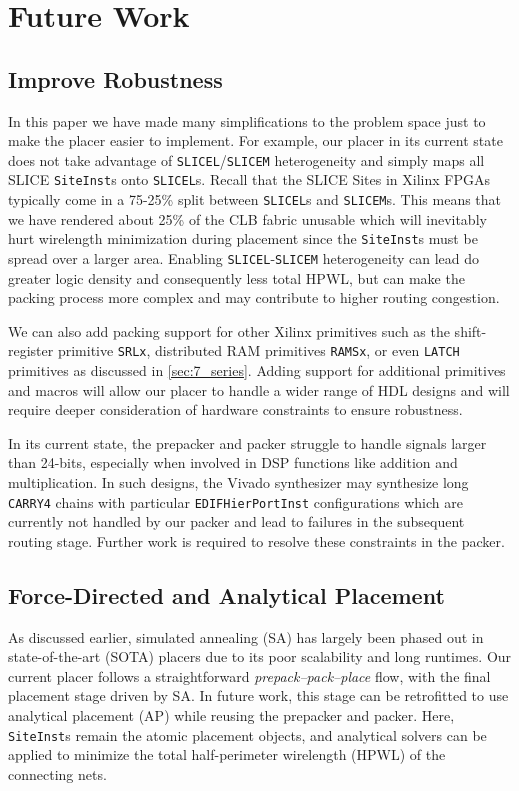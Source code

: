 \section{Future Work}


\subsection{Improve Robustness}
In this paper we have made many simplifications to the problem space just to make the placer easier to implement.
For example, our placer in its current state does not take advantage of \texttt{SLICEL}/\texttt{SLICEM} heterogeneity and simply maps all SLICE \texttt{SiteInst}s onto \texttt{SLICEL}s. 
Recall that the SLICE Sites in Xilinx FPGAs typically come in a 75-25\% split between \texttt{SLICEL}s and \texttt{SLICEM}s. 
This means that we have rendered about 25\% of the CLB fabric unusable which will inevitably hurt wirelength minimization during placement since the \texttt{SiteInst}s must be spread over a larger area. 
Enabling \texttt{SLICEL}-\texttt{SLICEM} heterogeneity can lead do greater logic density and consequently less total HPWL, but can make the packing process more complex and may contribute to higher routing congestion.

We can also add packing support for other Xilinx primitives such as the shift-register primitive \texttt{SRLx}, distributed RAM primitives \texttt{RAMSx}, or even \texttt{LATCH} primitives as discussed in \ref{sec:7_series}.
Adding support for additional primitives and macros will allow our placer to handle a wider range of HDL designs and will require deeper consideration of hardware constraints to ensure robustness.

In its current state, the prepacker and packer struggle to handle signals larger than 24-bits, especially when involved in DSP functions like addition and multiplication. 
In such designs, the Vivado synthesizer may synthesize long \texttt{CARRY4} chains with particular \texttt{EDIFHierPortInst} configurations which are currently not handled by our packer and lead to failures in the subsequent routing stage.
Further work is required to resolve these constraints in the packer.

\subsection{Force-Directed and Analytical Placement}
As discussed earlier, simulated annealing (SA) has largely been phased out in state-of-the-art (SOTA) placers due to its poor scalability and long runtimes. 
Our current placer follows a straightforward \emph{prepack–pack–place} flow, with the final placement stage driven by SA. 
In future work, this stage can be retrofitted to use analytical placement (AP) while reusing the prepacker and packer. 
Here, \texttt{SiteInst}s remain the atomic placement objects, and analytical solvers can be applied to minimize the total half-perimeter wirelength (HPWL) of the connecting nets.

